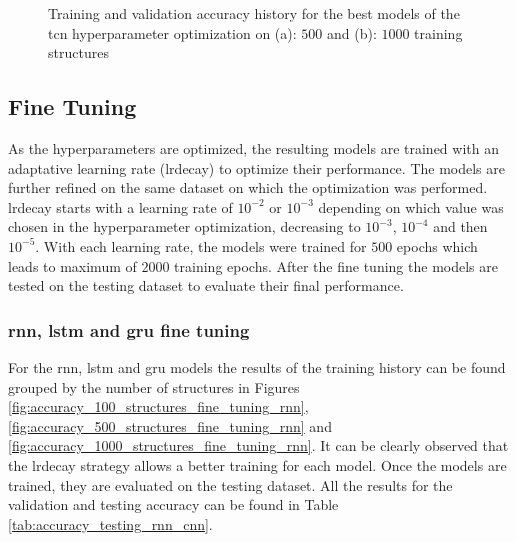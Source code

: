 \documentclass[conference]{IEEEtran}
\begin{document}
\begin{figure}[htp]
	\centering
	\quad
	\caption{Training and validation accuracy history for the best models of the \gls{tcn} hyperparameter optimization on (a): $ 500 $ and (b): $ 1000 $ training structures}
	\label{fig:accuracy_500_1000_structures_random_search_TCN}
\end{figure}

\subsection{Fine Tuning}
\label{sec:fine_tuning_results}

As the hyperparameters are optimized, the resulting models are trained with an adaptative learning rate (\gls{lrdecay}) to optimize their performance. The models are further refined on the same dataset on which the optimization was performed. \gls{lrdecay} starts with a learning rate of $10^{-2}$ or $10^{-3}$ depending on which value was chosen in the hyperparameter optimization, decreasing to $10^{-3}$, $10^{-4}$ and then $10^{-5}$. With each learning rate, the models were trained for $ 500 $ epochs which leads to maximum of $ 2000 $ training epochs. After the fine tuning the models are tested on the testing dataset to evaluate their final performance.

\subsubsection{\gls{rnn}, \gls{lstm} and \gls{gru} fine tuning}
\label{sec:rnn_fine_tuning_results}

For the \gls{rnn}, \gls{lstm} and \gls{gru} models the results of the training history can be found grouped by the number of structures in Figures \ref{fig:accuracy_100_structures_fine_tuning_rnn}, \ref{fig:accuracy_500_structures_fine_tuning_rnn} and \ref{fig:accuracy_1000_structures_fine_tuning_rnn}. It can be clearly observed that the \gls{lrdecay} strategy allows a better training for each model. Once the models are trained, they are evaluated on the testing dataset. All the results for the validation and testing accuracy can be found in Table \ref{tab:accuracy_testing_rnn_cnn}.  
\end{document}
